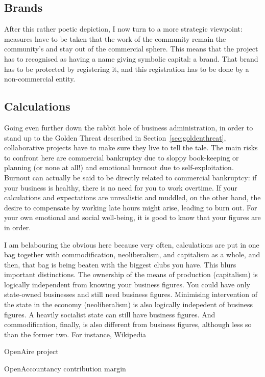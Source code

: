\documentclass[12pt]{article}
\begin{document}
\subsection{Brands}
After this rather poetic depiction, I now turn to a more strategic viewpoint: measures have to be taken that the work of the community remain the community's and stay out of the commercial sphere. This means that the project has to recognised as having a name giving symbolic capital: a brand. That brand has to be protected by registering it, and this registration has to be done by a non-commercial entity. 


\subsection{Calculations}
Going even further down the rabbit hole of business administration, in order to stand up to the Golden Threat described in Section~\ref{sec:goldenthreat}, collaborative projects have to make sure they live to tell the tale. The main risks to confront here are commercial bankruptcy due to sloppy book-keeping or planning (or none at all!) and emotional burnout due to self-exploitation. Burnout can actually be said to be directly related to commercial bankruptcy: if your business is healthy, there is no need for you to work overtime. If your calculations and expectations are unrealistic and muddled, on the other hand, the desire to compensate by working late hours might arise, leading to burn out. For your own emotional and social well-being, it is good to know that your figures are in order. 

I am belabouring the obvious here because very often, calculations are put in one bag together with commodification, neoliberalism, and capitalism as a whole, and then, that bag is being beaten with the biggest clubs you have. This blurs important distinctions. The ownership of the means of production (capitalism) is logically independent from knowing your business figures. You could have only state-owned businesses and still need business figures. Minimising intervention of the state in the economy (neoliberalism) is also logically indepedent of business figures. A heavily socialist state can still have business figures. And commodification, finally, is also different from business figures, although less so than the former two. For instance, Wikipedia %

OpenAire project

OpenAccountancy
            contribution margin 
\end{document}
